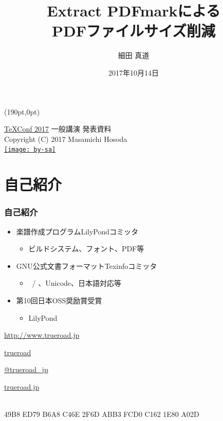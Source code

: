 \documentclass[unicode,17pt]{beamer}
\title[Extract PDFmark]{Extract PDFmarkによる \\ PDFファイルサイズ削減}
\author{細田 真道}
\institute[]{\url{http://www.trueroad.jp}}
\date[2017-10-14]{2017年10月14日}
\begin{document}
\begin{frame}
  \titlepage
  \begin{textblock*}{0.5\linewidth}(190pt,0pt)
    \begin{flushright}
      \tiny
      \href{https://texconf2017.tumblr.com/}%
           {TeXConf 2017} 一般講演 発表資料 \\
      Copyright (C) 2017 Masamichi Hosoda \\
      \href{https://creativecommons.org/licenses/by-sa/4.0/deed.ja}%
           {\texttt{[image: by-sa]}}
    \end{flushright}
  \end{textblock*}
\end{frame}

\section*{自己紹介}
\begin{frame}\frametitle{自己紹介}
  \begin{itemize}
    \small
  \item 楽譜作成プログラムLilyPondコミッタ
    \begin{itemize}
    \item ビルドシステム、フォント、PDF等
    \end{itemize}
  \item GNU公式文書フォーマットTexinfoコミッタ
    \begin{itemize}
    \item {}~/ 、Unicode、日本語対応等
    \end{itemize}
  \item 第10回日本OSS奨励賞受賞
    \begin{itemize}
      \item LilyPond
    \end{itemize}
  \end{itemize}

  \begin{block}{}
    \begin{description}
      \footnotesize
      \setlength{\parskip}{0pt}
      \setlength{\itemsep}{0pt}
    \item[URL] \url{http://www.trueroad.jp}
    \item[GitHub] \href{https://github.com/trueroad/}%
      {\ttfamily trueroad}
    \item[Twitter] \href{https://twitter.com/trueroad_jp}%
      {\ttfamily @trueroad\_jp}
    \item[Facebook] \href{https://www.facebook.com/trueroad.jp}%
      {\ttfamily trueroad.jp}
    \item[GPG Key fingerprint]\mbox{}\\
      {\hspace{-3em} 49B8 ED79 B6A8 C46E 2F6D  ABB3 FCD0 C162 1E80 A02D}
    \end{description}
  \end{block}
\end{frame}
\end{document}
